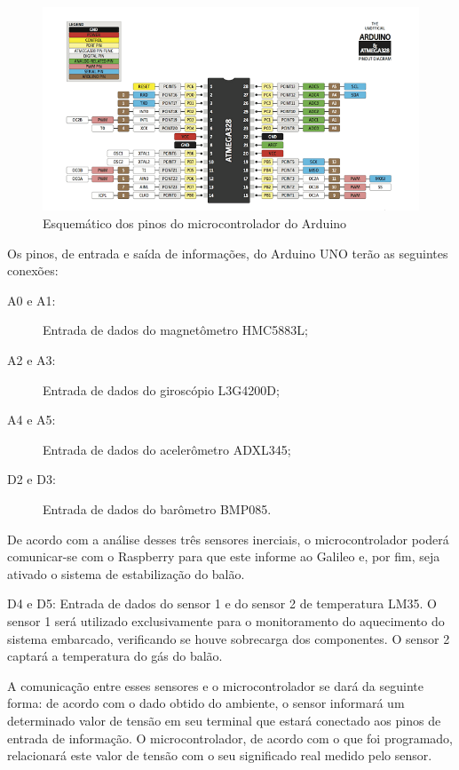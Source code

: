 		\begin{figure}[H]
		  \centering
		  \includegraphics[width=1\textwidth]{figuras/ATMEGA}
		  \caption[Esquemático dos pinos do microcontrolador do Arduino]{Esquemático dos pinos do microcontrolador do Arduino~\cite{embarcados2}}
		  \label{img:atmega}
		\end{figure}

		Os pinos, de entrada e saída de informações, do Arduino UNO terão as seguintes conexões:
		\begin{description}
			\item[A0 e A1:] Entrada de dados do magnetômetro HMC5883L;
			\item[A2 e A3:] Entrada de dados do giroscópio L3G4200D;
			\item[A4 e A5:] Entrada de dados do acelerômetro ADXL345;
			\item[D2 e D3:] Entrada de dados do barômetro BMP085.
		\end{description}

		De acordo com a análise desses três sensores inerciais, o microcontrolador poderá comunicar-se com o Raspberry para que este informe ao Galileo e, por fim, seja ativado o sistema de estabilização do balão.

		D4 e D5: Entrada de dados do sensor 1 e do sensor 2 de temperatura LM35. O sensor 1 será utilizado exclusivamente para o monitoramento do aquecimento do sistema embarcado, verificando se houve sobrecarga dos componentes. O sensor 2 captará a temperatura do gás do balão.

		A comunicação entre esses sensores e o microcontrolador se dará da seguinte forma: de acordo com o dado obtido do ambiente, o sensor informará um determinado valor de tensão em seu terminal que estará conectado aos pinos de entrada de informação. O microcontrolador, de acordo com o que foi programado, relacionará este valor de tensão com o seu significado real medido pelo sensor.

